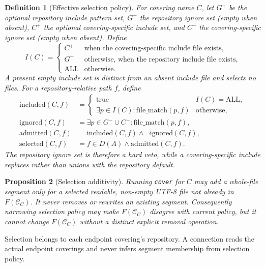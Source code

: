 \documentclass[11pt,a4paper]{article}
\newtheorem{definition}{Definition}[section]
\newtheorem{proposition}[definition]{Proposition}
\newcommand{\Cov}{\mathcal{C}}
\begin{document}
\begin{definition}[Effective selection policy]\label{def:selection}
For covering name $C$, let $G^+$ be the optional repository include pattern
set, $G^-$ the repository ignore set (empty when absent), $C^+$ the optional
covering-specific include set, and $C^-$ the covering-specific ignore set
(empty when absent). Define
\[
I(C) =
\begin{cases}
C^+ & \text{when the covering-specific include file exists},\\
G^+ & \text{otherwise, when the repository include file exists},\\
\mathrm{ALL} & \text{otherwise}.
\end{cases}
\]
A present empty include set is distinct from an absent include file and
selects no files. For a repository-relative path $f$, define
\[
\begin{aligned}
\mathrm{included}(C,f) &=
  \begin{cases}
  \mathrm{true} & I(C)=\mathrm{ALL},\\
  \exists p \in I(C): \mathrm{file\_match}(p,f) & \text{otherwise},
  \end{cases}\\
\mathrm{ignored}(C,f) &=
  \exists p \in G^- \cup C^-: \mathrm{file\_match}(p,f),\\
\mathrm{admitted}(C,f) &=
  \mathrm{included}(C,f) \land \neg\mathrm{ignored}(C,f),\\
\mathrm{selected}(C,f) &=
  f \in D(A) \land \mathrm{admitted}(C,f).
\end{aligned}
\]
The repository ignore set is therefore a hard veto, while a
covering-specific include replaces rather than unions with the repository
default.
\end{definition}

\begin{proposition}[Selection additivity]\label{prop:selection-additive}
Running \texttt{cover} for $C$ may add a whole-file segment only for a
selected readable, non-empty UTF-8 file not already in $F(\Cov_C)$. It never
removes or rewrites an existing segment. Consequently narrowing selection
policy may make $F(\Cov_C)$ disagree with current policy, but it cannot change
$F(\Cov_C)$ without a distinct explicit removal operation.
\end{proposition}

Selection belongs to each endpoint covering's repository. A connection reads
the actual endpoint coverings and never infers segment membership from
selection policy.
\end{document}
